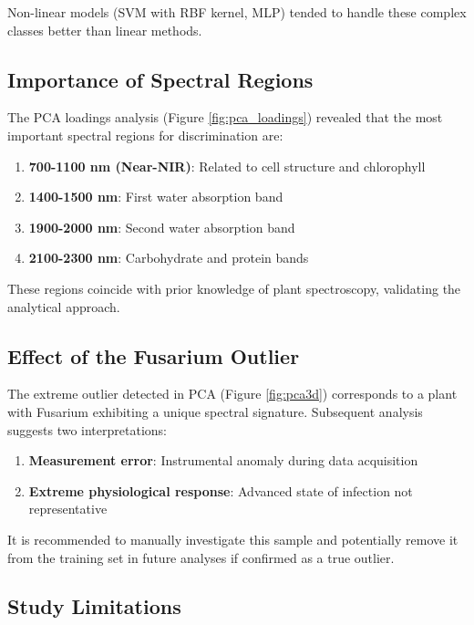\documentclass[12pt,a4paper]{article}
\begin{document}
Non-linear models (SVM with RBF kernel, MLP) tended to handle these complex classes better than linear methods.

\subsection{Importance of Spectral Regions}

The PCA loadings analysis (Figure \ref{fig:pca_loadings}) revealed that the most important spectral regions for discrimination are:

\begin{enumerate}
    \item \textbf{700-1100 nm (Near-NIR)}: Related to cell structure and chlorophyll
    \item \textbf{1400-1500 nm}: First water absorption band
    \item \textbf{1900-2000 nm}: Second water absorption band
    \item \textbf{2100-2300 nm}: Carbohydrate and protein bands
\end{enumerate}

These regions coincide with prior knowledge of plant spectroscopy, validating the analytical approach.

\subsection{Effect of the Fusarium Outlier}

The extreme outlier detected in PCA (Figure \ref{fig:pca3d}) corresponds to a plant with Fusarium exhibiting a unique spectral signature. Subsequent analysis suggests two interpretations:

\begin{enumerate}
    \item \textbf{Measurement error}: Instrumental anomaly during data acquisition
    \item \textbf{Extreme physiological response}: Advanced state of infection not representative
\end{enumerate}

It is recommended to manually investigate this sample and potentially remove it from the training set in future analyses if confirmed as a true outlier.

\subsection{Study Limitations}
\end{document}
